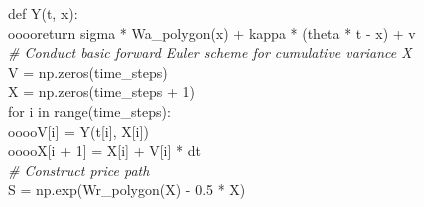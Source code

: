 \begin{linenumbers}
{def Y(t, x):\\
{\color{white}oooo}return sigma * Wa\_polygon(x) + kappa * (theta * t - x) + v\\
{\color{alt3}\emph{\# Conduct basic forward Euler scheme for cumulative variance X}}\\
V = np.zeros(time\_steps)\\
X = np.zeros(time\_steps + 1)\\
for i in range(time\_steps):\\
{\color{white}oooo}V[i] = Y(t[i], X[i])\\
{\color{white}oooo}X[i + 1] = X[i] + V[i] * dt\\
{\color{alt3}\emph{\# Construct price path}}\\
S = np.exp(Wr\_polygon(X) - 0.5 * X)
}
\end{linenumbers}
